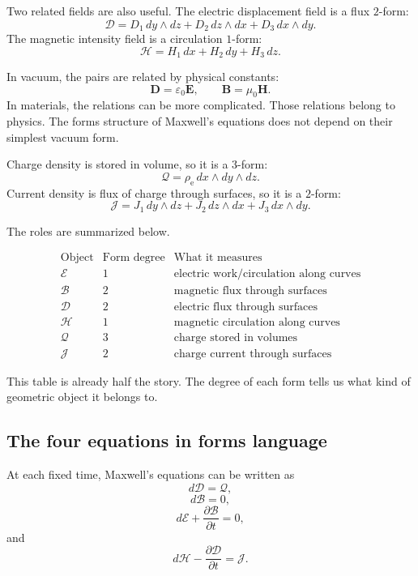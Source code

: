 Two related fields are also useful.  The electric displacement field is a flux \(2\)-form:
\[
\boxed{
    \mathcal D
    =
    D_1\,dy\wedge dz
    +
    D_2\,dz\wedge dx
    +
    D_3\,dx\wedge dy.
}
\]
The magnetic intensity field is a circulation \(1\)-form:
\[
\boxed{
    \mathcal H
    =
    H_1\,dx+H_2\,dy+H_3\,dz.
}
\]

In vacuum, the pairs are related by physical constants:
\[
    \mathbf D=\varepsilon_0\mathbf E,
    \qquad
    \mathbf B=\mu_0\mathbf H.
\]
In materials, the relations can be more complicated.  Those relations belong to
physics.  The forms structure of Maxwell's equations does not depend on their simplest
vacuum form.

Charge density is stored in volume, so it is a \(3\)-form:
\[
\boxed{
    \mathcal Q=\rho_{\mathrm e}\,dx\wedge dy\wedge dz.
}
\]
Current density is flux of charge through surfaces, so it is a \(2\)-form:
\[
\boxed{
    \mathcal J
    =
    J_1\,dy\wedge dz
    +
    J_2\,dz\wedge dx
    +
    J_3\,dx\wedge dy.
}
\]

The roles are summarized below.

\[
\begin{array}{c|c|c}
\text{Object} & \text{Form degree} & \text{What it measures} \\ \hline
\mathcal E & 1 & \text{electric work/circulation along curves}\\[1mm]
\mathcal B & 2 & \text{magnetic flux through surfaces}\\[1mm]
\mathcal D & 2 & \text{electric flux through surfaces}\\[1mm]
\mathcal H & 1 & \text{magnetic circulation along curves}\\[1mm]
\mathcal Q & 3 & \text{charge stored in volumes}\\[1mm]
\mathcal J & 2 & \text{charge current through surfaces}
\end{array}
\]

This table is already half the story.  The degree of each form tells us what kind of
geometric object it belongs to.

\subsection{The four equations in forms language}

At each fixed time, Maxwell's equations can be written as
\[
\boxed{
    d\mathcal D=\mathcal Q,
}
\]
\[
\boxed{
    d\mathcal B=0,
}
\]
\[
\boxed{
    d\mathcal E+\frac{\partial\mathcal B}{\partial t}=0,
}
\]
and
\[
\boxed{
    d\mathcal H-\frac{\partial\mathcal D}{\partial t}=\mathcal J.
}
\]

